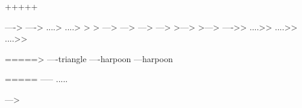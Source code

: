 \newarrowmiddle+++++%





\iffalse%
\newarrow{To}----{vee}%
\newarrow{Arr}----{LaTeX}%
\newarrow{Dotsto}....{vee}%
\newarrow{Dotsarr}....{LaTeX}%
\newarrow{Dashto}{}{dash}{}{dash}{vee}%
\newarrow{Dasharr}{}{dash}{}{dash}{LaTeX}%
\newarrow{Mapsto}{mapsto}---{vee}%
\newarrow{Mapsarr}{mapsto}---{LaTeX}%
\newarrow{IntoA}{hooka}---{vee}%
\newarrow{IntoB}{hookb}---{vee}%
\newarrow{Embed}{vee}---{vee}%
\newarrow{Emarr}{LaTeX}---{LaTeX}%
\newarrow{Onto}----{doublevee}%
\newarrow{Dotsonarr}....{doubleLaTeX}%
\newarrow{Dotsonto}....{doublevee}%
\newarrow{Dotsonarr}....{doubleLaTeX}%
\else%
---->%
---->%
....>%
....>%
>%
>%
--->%
--->%
--->%
--->%
>--->%
>--->%
----{>>}%
....{>>}%
....{>>}%
....{>>}%
\fi%

===={=>}%
----{triangle}%
----{harpoon}%
---{harpoon}%

=====%
-----%
.....%

--->

